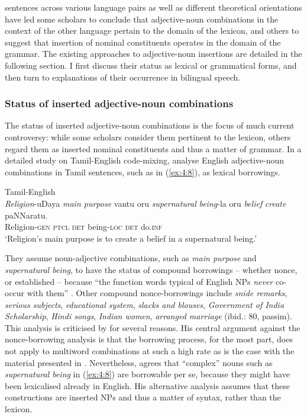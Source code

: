 sentences across various language pairs as well as different theoretical orientations have led some scholars to conclude that adjective-noun combinations in the context of the other language pertain to the domain of the lexicon, and others to suggest that insertion of nominal constituents operates in the domain of the grammar. The existing approaches to adjective-noun insertions are detailed in the following section. I first discuss their status as lexical or grammatical forms, and then turn to explanations of their occurrence in bilingual speech.

\subsubsection{Status of inserted adjective-noun combinations}
The status of inserted adjective-noun combinations is the focus of much current controversy: while some scholars consider them pertinent to the lexicon, others regard them as inserted nominal constituents and thus a matter of grammar. In a detailed study on Tamil-English code-mixing, \citet{sankoff-et-al-1990} analyse English adjective-noun combinations in Tamil sentences, such as in (\ref{ex:4:8}), as lexical borrowings.

\ea{\label{ex:4:8}}
Tamil-English \citep[96]{sankoff-et-al-1990}\\
\gll \textit{Religion}-uDaya \textit{main purpose} vantu oru \textit{supernatural} \textit{being}-la oru \textit{belief} \textit{create} paNNaratu.\\
	\textcolor[rgb]{1,1,1}{Religion}-\textsc{gen} {} \textsc{ptcl} \textsc{det} {} \textcolor[rgb]{1,1,1}{being}-\textsc{loc} \textsc{det} {} {} do.\textsc{inf}\\
\glt `Religion's main purpose is to create a belief in a supernatural being.'
\z

\noindent They assume noun-adjective combinations, such as \textit{main purpose} and \textit{supernatural being}, to have the status of compound borrowings -- whether nonce, or established -- because ``the function words typical of English NPs \textit{never} co-occur with them'' \citep[80, emphasis in the original]{sankoff-et-al-1990}. Other compound nonce-borrowings include \textit{snide remarks}, \textit{serious subjects}, \textit{educational system}, \textit{slacks and blouses}, \textit{Government of India Scholarship}, \textit{Hindi songs}, \textit{Indian women}, \textit{arranged marriage} (ibid.: 80, passim). This analysis is criticised by \citet[78--81]{muysken-bilingual-2000} for several reasons. His central argument against the nonce-borrowing analysis is that the borrowing process, for the most part, does not apply to multiword combinations at such a high rate as is the case with the material presented in \citet{sankoff-et-al-1990}. Nevertheless, \citet[][79]{muysken-bilingual-2000} agrees that ``complex'' nouns such as \textit{supernatural being} in (\ref{ex:4:8}) are borrowable per se, because they might have been lexicalised already in English. His alternative  analysis assumes that these constructions are inserted NPs and thus a matter of syntax, rather than the lexicon.

